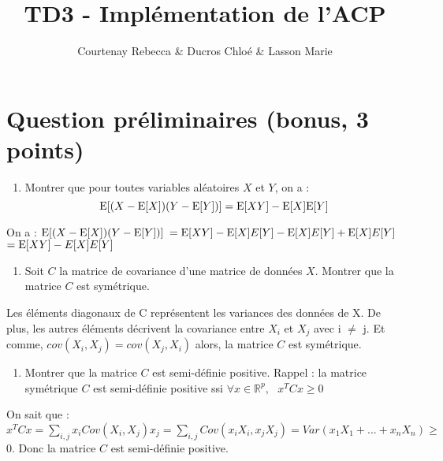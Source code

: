 \documentclass[
]{article}
\title{TD3 - Implémentation de l'ACP}
\author{Courtenay Rebecca \& Ducros Chloé \& Lasson Marie}
\date{}
\providecommand{\tightlist}{%
  \setlength{\itemsep}{0pt}\setlength{\parskip}{0pt}}
\begin{document}
\maketitle

{
\setcounter{tocdepth}{2}
\tableofcontents
}
\hypertarget{question-pruxe9liminaires-bonus-3-points}{%
\section{Question préliminaires (bonus, 3
points)}\label{question-pruxe9liminaires-bonus-3-points}}

\begin{enumerate}
\def\labelenumi{\alph{enumi}.}
\tightlist
\item
  Montrer que pour toutes variables aléatoires \(X\) et \(Y\), on a :
  \[\text E[(X-\text E[X])(Y-\text E[Y])] = \text E[XY] - \text E[X] \text E[Y]\]
\end{enumerate}

On a : \newline \(\text E[(X-\text E[X])(Y-\text E[Y])]\)
\newline \(= \text E[XY] - \text E[X]E[Y] - \text E[X]E[Y] + \text E[X]E[Y]\)
\newline \(= \text E[XY] - E[X]E[Y]\)

\begin{enumerate}
\def\labelenumi{\alph{enumi}.}
\setcounter{enumi}{1}
\tightlist
\item
  Soit \(C\) la matrice de covariance d'une matrice de données \(X\).
  Montrer que la matrice \(C\) est symétrique.
\end{enumerate}

Les éléments diagonaux de C représentent les variances des données de X.
De plus, les autres éléments décrivent la covariance entre \(X_{i}\) et
\(X_{j}\) avec i \(\ne\) j. Et comme,
\(cov(X_{i},X_{j}) = cov(X_{j},X_{i})\) alors, la matrice \(C\) est
symétrique.

\begin{enumerate}
\def\labelenumi{\alph{enumi}.}
\setcounter{enumi}{2}
\tightlist
\item
  Montrer que la matrice \(C\) est semi-définie positive. Rappel : la
  matrice symétrique \(C\) est semi-définie positive ssi
  \(\forall x \in \mathbb R^p, \text{ } x^TCx \geq 0\)
\end{enumerate}

On sait que :
\(x^TCx = \sum_{i,j}x_{i }Cov(X_{i},X_{j})x_{j} = \sum_{i,j}Cov(x_{i}X_{i},x_{j}X_{j}) = Var(x_{1}X_{1}+...+x_{n}X_{n}) \ge\)
0. \newline Donc la matrice \(C\) est semi-définie positive.
\end{document}
